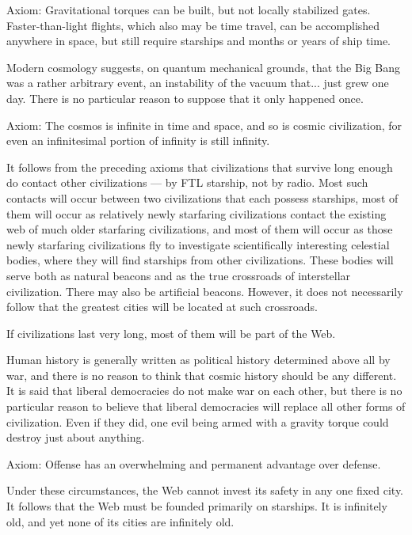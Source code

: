 \documentclass[english,11pt,letterpaper,onecolumn]{scrbook}
\begin{document}
Axiom:	Gravitational torques can be built, but not locally stabilized gates.  Faster-than-light flights, which also may be time travel, can be accomplished anywhere in space, but still require starships and months or years of ship time.


Modern cosmology suggests, on quantum mechanical grounds, that the Big Bang was a rather arbitrary event, an instability of the vacuum that... just grew one day.  There is no particular reason to suppose that it only happened once.

Axiom:	The cosmos is infinite in time and space, and so is cosmic civilization, for even an infinitesimal portion of infinity is still infinity.

It follows from the preceding axioms that civilizations that survive long enough do contact other civilizations ---  by FTL starship, not by radio.  Most such contacts will occur between two civilizations that each possess starships, most of them will occur as relatively newly starfaring civilizations contact the existing web of much older starfaring civilizations, and most of them will occur as those newly starfaring civilizations fly to investigate scientifically interesting celestial bodies, where they will find starships from other civilizations.  These bodies will serve both as natural beacons and as the true crossroads of interstellar civilization.  There may also be artificial beacons.  However, it does not necessarily follow that the greatest cities will be located at such crossroads.

If civilizations last very long, most of them will be part of the Web.


Human history is generally written as political history determined above all by war, and there is no reason to think that cosmic history should be any different.  It is said that liberal democracies do not make war on each other, but there is no particular reason to believe that liberal democracies will replace all other forms of civilization.  Even if they did, one evil being armed with a gravity torque could destroy just about anything.

Axiom:	Offense has an overwhelming and permanent advantage over defense.

Under these circumstances, the Web cannot invest its safety in any one fixed city.  It follows that the Web must be founded primarily on starships.  It is infinitely old, and yet none of its cities are infinitely old.
\end{document}
